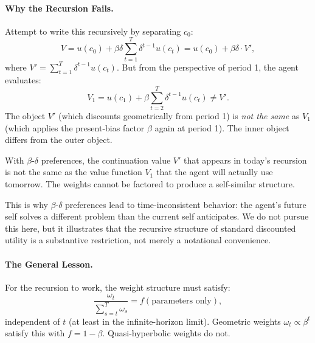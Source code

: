 \paragraph{Why the Recursion Fails.}
Attempt to write this recursively by separating $c_0$:
\begin{equation}
V = u(c_0) + \beta \delta \sum_{t=1}^{T} \delta^{t-1} u(c_t) = u(c_0) + \beta \delta \cdot V',
\label{eq:beta-delta-attempt}
\end{equation}
where $V' = \sum_{t=1}^{T} \delta^{t-1} u(c_t)$. But from the perspective of period 1, the agent evaluates:
\begin{equation}
V_1 = u(c_1) + \beta \sum_{t=2}^{T} \delta^{t-1} u(c_t) \neq V'.
\label{eq:beta-delta-v1}
\end{equation}
The object $V'$ (which discounts geometrically from period 1) is \emph{not the same} as $V_1$ (which applies the present-bias factor $\beta$ again at period 1). The inner object differs from the outer object.

\begin{calloutnote}
With $\beta$-$\delta$ preferences, the continuation value $V'$ that appears in today's recursion is not the same as the value function $V_1$ that the agent will actually use tomorrow. The weights cannot be factored to produce a self-similar structure.

This is why $\beta$-$\delta$ preferences lead to time-inconsistent behavior: the agent's future self solves a different problem than the current self anticipates. We do not pursue this here, but it illustrates that the recursive structure of standard discounted utility is a substantive restriction, not merely a notational convenience.
\end{calloutnote}

\paragraph{The General Lesson.}
For the recursion to work, the weight structure must satisfy:
\begin{equation}
\frac{\omega_t}{\sum_{s=t}^{T} \omega_s} = f(\text{parameters only}),
\label{eq:factorization-condition}
\end{equation}
independent of $t$ (at least in the infinite-horizon limit). Geometric weights $\omega_t \propto \beta^t$ satisfy this with $f = 1 - \beta$. Quasi-hyperbolic weights do not.

